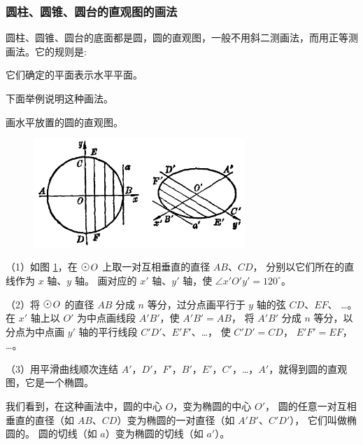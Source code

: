 \begin{enhancedline}
\begin{lianxi}
\end{lianxi}


\subsubsection{圆柱、圆锥、圆台的直观图的画法}

圆柱、圆锥、圆台的底面都是圆，圆的直观图，一般不用斜二测画法，而用正等测画法。它的规则是:

它们确定的平面表示水平平面。



下面举例说明这种画法。

\liti 画水平放置的圆的直观图。

\begin{figure}[htbp]
    \centering
    \includegraphics[width=8cm]{../pic/ltjh-ch2-33.png}
    \caption{}\label{fig:ltjh-2-33}
\end{figure}

\huafa （1）如图 \ref{fig:ltjh-2-33}，在 $\yuan\,O$ 上取一对互相垂直的直径 $AB$、$CD$，
分别以它们所在的直线作为 $x$ 轴、$y$ 轴。 画对应的 $x'$ 轴、$y'$ 轴，使 $\angle x'O'y' = 120^\circ$。

（2）将 $\yuan\,O$ 的直径 $AB$ 分成 $n$ 等分，过分点画平行于 $y$ 轴的弦 $CD$、$EF$、 …。
在 $x'$ 轴上以 $O'$ 为中点画线段 $A'B'$，使 $A'B' = AB$，
将 $A'B'$ 分成 $n$ 等分，以分点为中点画 $y'$ 轴的平行线段 $C'D'$、$E'F'$、…，
使 $C'D' = CD$， $E'F' = EF$， …。

（3）用平滑曲线顺次连结 $A'$，$D'$，$F'$，$B'$，$E'$，$C'$，…，$A'$，就得到圆的直观图，它是一个椭圆。

我们看到，在这种画法中，圆的中心 $O$，变为椭圆的中心 $O'$，
圆的任意一对互相垂直的直径（如 $AB$、$CD$）变为椭圆的一对直径（如 $A'B'$、$C'D'$），
它们叫做椭圆的。
圆的切线（如 $a$）变为椭圆的切线（如 $a'$）。


\end{enhancedline}
